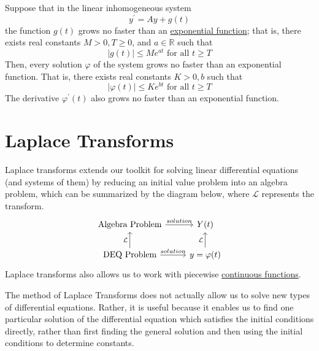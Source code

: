 \documentclass{article}
\newcounter{theorem}[section]
\begin{document}
      \begin{theorem}
        \label{thm:upper-bound-on-growth-rate-of-solutions-of}
      Suppose that in the linear inhomogeneous system 
      \begin{equation}
        y^\prime = A y + g(t)
      \end{equation}
      the function $g(t)$ grows no faster than an \hyperref[real-def:exponential-function]{exponential function}; that is, there exists real constants $M > 0, T \geq 0$, and $a \in \mathbb{R}$ such that
      \begin{equation}
        |g(t)| \leq M e^{at} \text{ for all } t \geq T
      \end{equation}
      Then, every solution $\varphi$ of the system grows no faster than an exponential function. That is, there exists real constants $K>0, b$ such that
      \begin{equation}
        |\varphi(t)| \leq K e^{bt} \text{ for all } t \geq T
      \end{equation}
      The derivative $\varphi^\prime (t)$ also grows no faster than an exponential function. 
      \end{theorem}

\section{Laplace Transforms}

  Laplace transforms extends our toolkit for solving linear differential equations (and systems of them) by reducing an initial value problem into an algebra problem, which can be summarized by the diagram below, where $\mathcal{L}$ represents the transform. 
  \begin{equation}
    \begin{tikzcd}
      \text{Algebra Problem} \arrow{r}{solution} &  Y(t)\\
      \text{DEQ Problem} \arrow{u}{\mathcal{L}} \arrow{r}{solution} & y = \varphi(t) \arrow{u}{\mathcal{L}}
    \end{tikzcd}
  \end{equation}
  Laplace transforms also allows us to work with piecewise \hyperref[pst-def:continuous_func]{continuous functions}. 

  The method of Laplace Transforms does not actually allow us to solve new types of differential equations. Rather, it is useful because it enables us to find one particular solution of the differential equation which satisfies the initial conditions directly, rather than first finding the general solution and then using the initial conditions to determine constants. 
\end{document}
